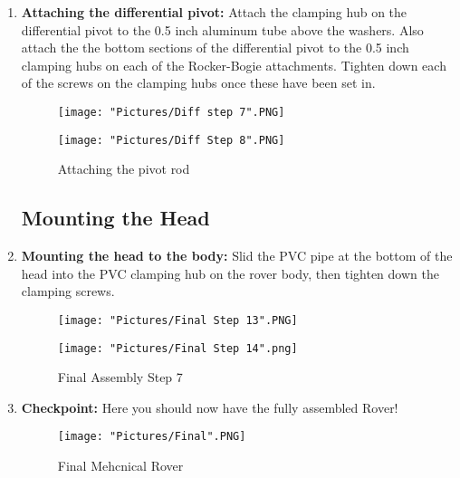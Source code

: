\documentclass[12pt]{article}
\begin{document}
\begin{enumerate}
	\item \textbf{Attaching the differential pivot:} Attach the clamping hub on the differential pivot to the 0.5 inch aluminum tube above the washers. Also attach the the bottom sections of the differential pivot to the 0.5 inch clamping hubs on each of the Rocker-Bogie attachments. Tighten down each of the screws on the clamping hubs once these have been set in.

\begin{figure}[H]
  	\centering
  	\begin{minipage}[b]{0.35\textwidth}
   		\texttt{[image: "Pictures/Diff step 7".PNG]}
  	\end{minipage}
  	\hfill
  	\begin{minipage}[b]{0.35\textwidth}
    		\texttt{[image: "Pictures/Diff Step 8".PNG]}
  	\end{minipage}
  	\caption{Attaching the pivot rod}
\end{figure}

\subsection{Mounting the Head}

\item \textbf{Mounting the head to the body:} Slid the PVC pipe at the bottom of the head into the PVC clamping hub on the rover body, then tighten down the clamping screws. 

\begin{figure}[H]
  \centering
  \begin{minipage}[b]{0.45\textwidth}
    \texttt{[image: "Pictures/Final Step 13".PNG]}
  \end{minipage}
  \hfill
  \begin{minipage}[b]{0.45\textwidth}
    \texttt{[image: "Pictures/Final Step 14".png]}
  \end{minipage}
  \caption{Final Assembly Step 7}
\end{figure}

\item \textbf{Checkpoint: } Here you should now have the fully assembled Rover! 
\begin{figure}[H]
  \centering
    \texttt{[image: "Pictures/Final".PNG]}
  \caption{Final Mehcnical Rover}
\end{figure}

\end{enumerate}
\end{document}
